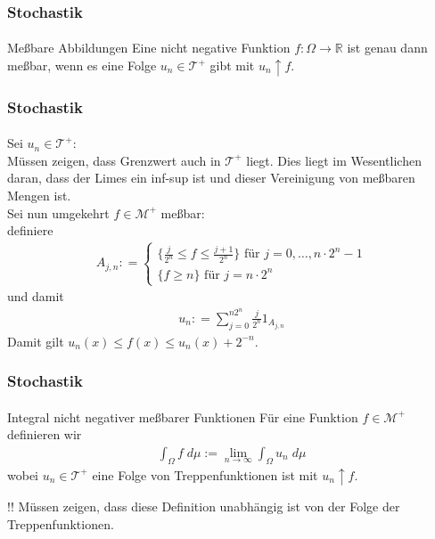 \documentclass{beamer}
\begin{document}
\begin{frame}
    \frametitle{Stochastik}
\framesubtitle{}
    \begin{block}{Meßbare Abbildungen}
        Eine nicht negative Funktion $f:\Omega \to \mathbb{R}$ ist genau dann meßbar, wenn
        es eine Folge $u_n \in \mathcal{T}^+$ gibt mit $u_n \uparrow f$.
    \end{block}

\end{frame}


\begin{frame}
    \frametitle{Stochastik}
\framesubtitle{}
Sei $u_n \in \mathcal{T}^+$: \\
Müssen zeigen, dass Grenzwert auch in $\mathcal{T}^+$ liegt.
Dies liegt im Wesentlichen daran, dass der Limes ein inf-sup ist und dieser Vereinigung von meßbaren Mengen ist.
\\
Sei nun umgekehrt $f \in \mathcal{M}^+$ meßbar: \\
definiere
\begin{align*}
    A_{j,n} : = \begin{cases} 
        \{ \frac{j}{2^n} \leq f \leq \frac{j+1}{2^n} \} \text{ für } j= 0, \dots, n \cdot 2^n -1 \\
        \{  f \geq n \} \text{ für } j= n \cdot 2^n 
    \end{cases}
\end{align*}
und damit 
\begin{align*}
    u_n : =  \sum_{j= 0}^{n2^n} \frac{j}{2^n} 1_{A_{j,n}}
\end{align*}
Damit gilt $u_n(x) \leq f(x) \leq u_n(x) +2^{-n}$.
\end{frame}



 
\begin{frame}
    \frametitle{Stochastik}
\framesubtitle{}
    \begin{block}{Integral nicht negativer meßbarer Funktionen}
        Für eine Funktion $f \in \mathcal{M}^+$ definieren wir
        \begin{align*}
            \int_{\Omega} f \;  d \mu := \lim_{n \to \infty} \int_{\Omega} u_n \; d \mu  
        \end{align*}
        wobei $u_n \in \mathcal{T}^+$ eine Folge von Treppenfunktionen ist mit 
        $u_n \uparrow f$.

        
    \end{block}
    \begin{block}{!!}
    Müssen zeigen, dass diese Definition unabhängig ist von der Folge der Treppenfunktionen.
\end{block}
\end{frame}
\end{document}
